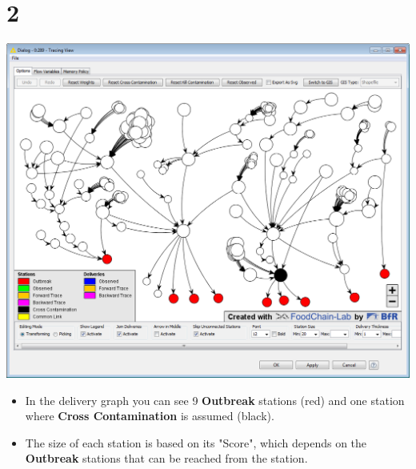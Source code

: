 \documentclass{beamer}
\begin{document}
\section{2}
\begin{frame}
	\begin{center}
  		\includegraphics[height=0.6\textheight]{2.png}
	\end{center}
	\begin{itemize}
		\item In the delivery graph you can see 9 \textbf{Outbreak} stations (red) and one station where \textbf{Cross Contamination} is assumed (black).
		\item The size of each station is based on its "Score", which depends on the \textbf{Outbreak} stations that can be reached from the station.
	\end{itemize}
\end{frame}
\end{document}
